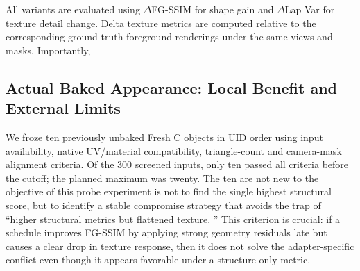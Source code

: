 \documentclass[times,twocolumn,final]{elsarticle}
\providecommand{\DIFadd}[1]{{\protect\color{blue} \sf #1}} %
\providecommand{\DIFdel}[1]{{\protect\color{red} \scriptsize #1}} %
\providecommand{\DIFaddbegin}{} %
\providecommand{\DIFaddend}{} %
\providecommand{\DIFdelbegin}{} %
\providecommand{\DIFdelend}{} %
\begin{document}
\DIFdelbegin \DIFdel{All variants are evaluated using $\Delta$FG-SSIM for shape gain and $\Delta$Lap Var for texture detail change. Delta texture metrics are computed relative to the corresponding ground-truth foreground renderings under the same views and masks. Importantly, }\DIFdelend \DIFaddbegin \subsection{Actual Baked Appearance: Local Benefit and External Limits}
\label{subsec:new-bake}
\DIFadd{We froze ten previously unbaked Fresh C objects in UID order using input availability, native UV/material compatibility, triangle-count and camera-mask alignment criteria. Of the 300 screened inputs, only ten passed all criteria before the cutoff; the planned maximum was twenty. The ten are not new to }\DIFaddend the \DIFdelbegin \DIFdel{objective of this probe experiment is not to find the single highest structural score, but to identify a stable compromise strategy that avoids the trap of ``higher structural metrics but flattened texture. '' This criterion is crucial: if a schedule improves FG-SSIM by applying strong geometry residuals late but causes a clear drop in texture response, then it does not solve the adapter-specific conflict even though it appears favorable under a structure-only metric.
}%

\end{document}

